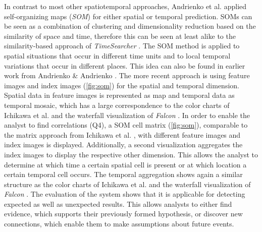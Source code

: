 \documentclass[electronic]{vgtc}             %
\begin{document}
In contrast to most other spatiotemporal approaches, Andrienko et al. \cite{Andrienko:2010:Space} applied self-organizing maps (\textit{SOM}) for either spatial or temporal prediction.
SOMs can be seen as a combination of clustering and dimensionality reduction based on the similarity of space and time, therefore this can be seen at least alike to the similarity-based approach of \textit{TimeSearcher} \cite{buono:2007}.
The SOM method is applied to spatial situations that occur in different time units and to local temporal variations that occur in different places.
This idea can also be found in earlier work from Andrienko \& Andrienko \cite{Andrienko:2005}.
The more recent approach is using feature images and index images (\autoref{fig:som}) for the spatial and temporal dimension.
Spatial data in feature images is represented as map and temporal data as temporal mosaic, which has a large correspondence to the color charts of Ichikawa et al. \cite{ichikawa:2002} and the waterfall visualization of \textit{Falcon}  \cite{steed:2017}.
In order to enable the analyst to find correlations (Q4), a SOM cell matrix (\autoref{fig:som}), comparable to the matrix approach from Ichikawa et al. \cite{ichikawa:2002}, with different feature images and index images is displayed.
Additionally, a second visualization aggregates the index images to display the respective other dimension.
This allows the analyst to determine at which time a certain spatial cell is present or at which location a certain temporal cell occurs.
The temporal aggregation shows again a similar structure as the color charts of Ichikawa et al. \cite{ichikawa:2002} and the waterfall visualization of \textit{Falcon}  \cite{steed:2017}.
The evaluation of the system shows that it is applicable for detecting expected as well as unexpected results.
This allows analysts to either find evidence, which supports their previously formed hypothesis, or discover new connections, which enable them to make assumptions about future events. 
\end{document}
